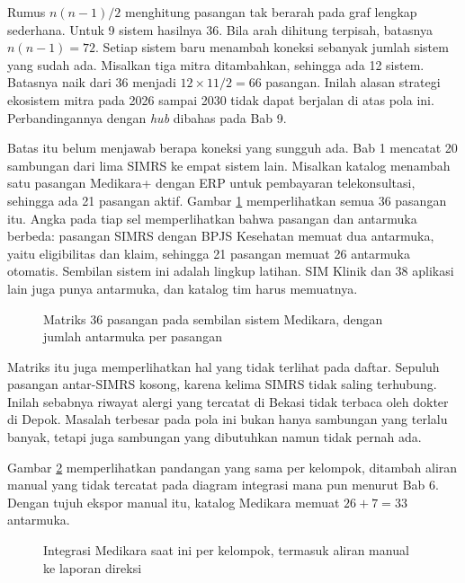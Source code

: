 Rumus $n(n-1)/2$ menghitung pasangan tak berarah pada graf lengkap sederhana. Untuk 9 sistem hasilnya 36.
Bila arah dihitung terpisah, batasnya $n(n-1) = 72$. Setiap sistem baru menambah koneksi sebanyak jumlah
sistem yang sudah ada. Misalkan tiga mitra ditambahkan, sehingga ada 12 sistem. Batasnya naik dari 36 menjadi
$12 \times 11 / 2 = 66$ pasangan. Inilah alasan strategi ekosistem mitra pada 2026 sampai 2030 tidak dapat
berjalan di atas pola ini. Perbandingannya dengan \textit{hub} dibahas pada Bab 9.

Batas itu belum menjawab berapa koneksi yang sungguh ada. Bab 1 mencatat 20 sambungan dari lima SIMRS ke
empat sistem lain. Misalkan katalog menambah satu pasangan Medikara+ dengan ERP untuk pembayaran telekonsultasi,
sehingga ada 21 pasangan aktif. Gambar \ref{fig:ch07-matriks-pasangan} memperlihatkan semua 36 pasangan itu.
Angka pada tiap sel memperlihatkan bahwa pasangan dan antarmuka berbeda: pasangan SIMRS dengan BPJS Kesehatan
memuat dua antarmuka, yaitu eligibilitas dan klaim, sehingga 21 pasangan memuat 26 antarmuka otomatis. Sembilan
sistem ini adalah lingkup latihan. SIM Klinik dan 38 aplikasi lain juga punya antarmuka, dan katalog tim harus
memuatnya.

\begin{figure}[!htb]
  \centering
  
  \caption{Matriks 36 pasangan pada sembilan sistem Medikara, dengan jumlah antarmuka per pasangan}
  \label{fig:ch07-matriks-pasangan}
\end{figure}

Matriks itu juga memperlihatkan hal yang tidak terlihat pada daftar. Sepuluh pasangan antar-SIMRS kosong, karena
kelima SIMRS tidak saling terhubung. Inilah sebabnya riwayat alergi yang tercatat di Bekasi tidak terbaca oleh
dokter di Depok. Masalah terbesar pada pola ini bukan hanya sambungan yang terlalu banyak, tetapi juga sambungan
yang dibutuhkan namun tidak pernah ada.

Gambar \ref{fig:ch07-integrasi-saat-ini} memperlihatkan pandangan yang sama per kelompok, ditambah aliran manual
yang tidak tercatat pada diagram integrasi mana pun menurut Bab 6. Dengan tujuh ekspor manual itu, katalog
Medikara memuat $26 + 7 = 33$ antarmuka.

\begin{figure}[!htb]
  \centering
  
  \caption{Integrasi Medikara saat ini per kelompok, termasuk aliran manual ke laporan direksi}
  \label{fig:ch07-integrasi-saat-ini}
\end{figure}

